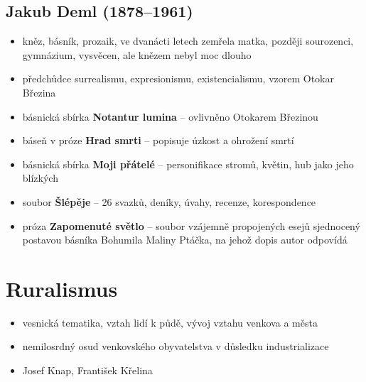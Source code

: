 \subsection{Jakub Deml (1878--1961)} 
\begin{itemize}
\item kněz, básník, prozaik, ve dvanácti letech zemřela matka, později sourozenci, gymnázium, vysvěcen, ale knězem nebyl moc dlouho
\item předchůdce surrealismu, expresionismu, existencialismu, vzorem Otokar Březina
\item básnická sbírka \textbf{Notantur lumina} -- ovlivněno Otokarem Březinou
\item báseň v próze \textbf{Hrad smrti} -- popisuje úzkost a ohrožení smrtí
\item básnická sbírka \textbf{Moji přátelé} -- personifikace stromů, květin, hub jako jeho blízkých
\item soubor \textbf{Šlépěje} -- 26 svazků, deníky, úvahy, recenze, korespondence
\item próza \textbf{Zapomenuté světlo} -- soubor vzájemně propojených esejů sjednocený postavou básníka Bohumila Maliny Ptáčka, na jehož dopis autor odpovídá
\end{itemize}

\section{Ruralismus}
\begin{itemize}
\item  vesnická tematika, vztah lidí k půdě, vývoj vztahu venkova a města
\item nemilosrdný osud venkovského obyvatelstva v důsledku industrializace
\item Josef Knap, František Křelina
\end{itemize}




